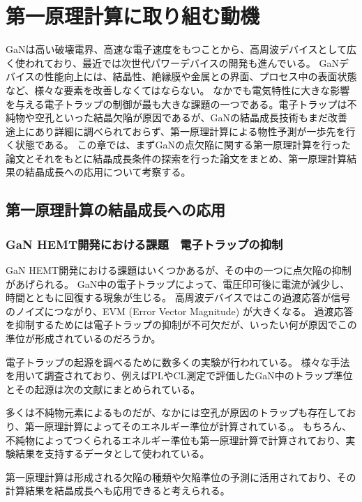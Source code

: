 \chapter{第一原理計算に取り組む動機}

\begin{summary}
GaNは高い破壊電界、高速な電子速度をもつことから、高周波デバイスとして広く使われており、最近では次世代パワーデバイスの開発も進んでいる。
GaNデバイスの性能向上には、結晶性、絶縁膜や金属との界面、プロセス中の表面状態など、様々な要素を改善しなくてはならない。
なかでも電気特性に大きな影響を与える電子トラップの制御が最も大きな課題の一つである。電子トラップは不純物や空孔といった結晶欠陥が原因であるが、GaNの結晶成長技術もまだ改善途上にあり詳細に調べられておらず、第一原理計算による物性予測が一歩先を行く状態である。
この章では、まずGaNの点欠陥に関する第一原理計算を行った論文とそれをもとに結晶成長条件の探索を行った論文をまとめ、第一原理計算結果の結晶成長への応用について考察する。
\end{summary}

\section{第一原理計算の結晶成長への応用}
\subsection{GaN HEMT開発における課題　電子トラップの抑制}
GaN HEMT開発における課題はいくつかあるが、その中の一つに点欠陥の抑制があげられる。
GaN中の電子トラップによって、電圧印可後に電流が減少し、時間とともに回復する現象が生じる。
高周波デバイスではこの過渡応答が信号のノイズにつながり、EVM (Error Vector Magnitude) が大きくなる。
過渡応答を抑制するためには電子トラップの抑制が不可欠だが、いったい何が原因でこの準位が形成されているのだろうか。

電子トラップの起源を調べるために数多くの実験が行われている。
様々な手法を用いて調査されており、例えばPLやCL測定で評価したGaN中のトラップ準位とその起源は次の文献にまとめられている\cite{defects_gan}。

多くは不純物元素によるものだが、なかには空孔が原因のトラップも存在しており、第一原理計算によってそのエネルギー準位が計算されている\cite{dft_gan_defect_2004},\cite{dft_gan_defect_2017}。
もちろん、不純物によってつくられるエネルギー準位も第一原理計算で計算されており、実験結果を支持するデータとして使われている。

第一原理計算は形成される欠陥の種類や欠陥準位の予測に活用されており、その計算結果を結晶成長へも応用できると考えられる。


